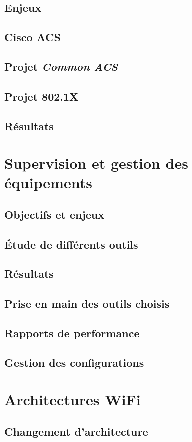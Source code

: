 \documentclass[a4paper,12pt]{report}
\begin{document}
\subsection{Enjeux}
\subsection{Cisco ACS}
\subsection{Projet \textit{Common ACS}}
\subsection{Projet 802.1X} %
\subsection{Résultats}%
\section{Supervision et gestion des équipements}
\subsection{Objectifs et enjeux}
\subsection{Étude de différents outils}
\subsection{Résultats}
\subsection{Prise en main des outils choisis}
\subsection{Rapports de performance}
\subsection{Gestion des configurations}
\section{Architectures WiFi}
\subsection{Changement d'architecture}
\end{document}
